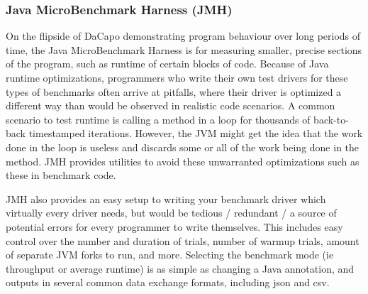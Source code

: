 \subsubsection{Java MicroBenchmark Harness (JMH)}
On the flipside of DaCapo demonstrating program behaviour over long periods of time, the Java MicroBenchmark Harness is for measuring smaller, precise sections of the program, such as runtime of certain blocks of code. Because of Java runtime optimizations, programmers who write their own test drivers for these types of benchmarks often arrive at pitfalls, where their driver is optimized a different way than would be observed in realistic code scenarios. A common scenario to test runtime is calling a method in a loop for thousands of back-to-back timestamped iterations. However, the JVM might get the idea that the work done in the loop is useless and discards some or all of the work being done in the method. JMH provides utilities to avoid these unwarranted optimizations such as these in benchmark code.

JMH also provides an easy setup to writing your benchmark driver which virtually every driver needs, but would be tedious / redundant / a source of potential errors for every programmer to write themselves. This includes easy control over the number and duration of trials, number of warmup trials, amount of separate JVM forks to run, and more. Selecting the benchmark mode (ie throughput or average runtime) is as simple as changing a Java annotation, and outputs in several common data exchange formats, including json and csv.

